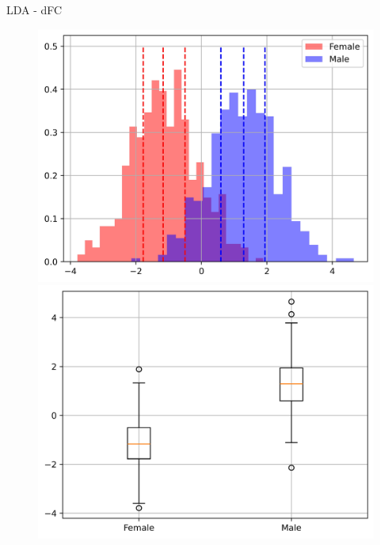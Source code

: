 \documentclass{beamer}
\begin{document}
\begin{frame}{LDA - dFC}
\begin{figure}[H]
{\begin{minipage}[b]{0.3\textwidth}
                \includegraphics[width=1\textwidth]{../Analysis/LDA/node=25_size=480_step=180_rho=0.1/hist_13.jpg}
                \includegraphics[width=1\textwidth]{../Analysis/LDA/node=25_size=480_step=180_rho=0.1/box_13.jpg}
            \end{minipage}
        }
\end{figure}
\end{frame}
\end{document}
